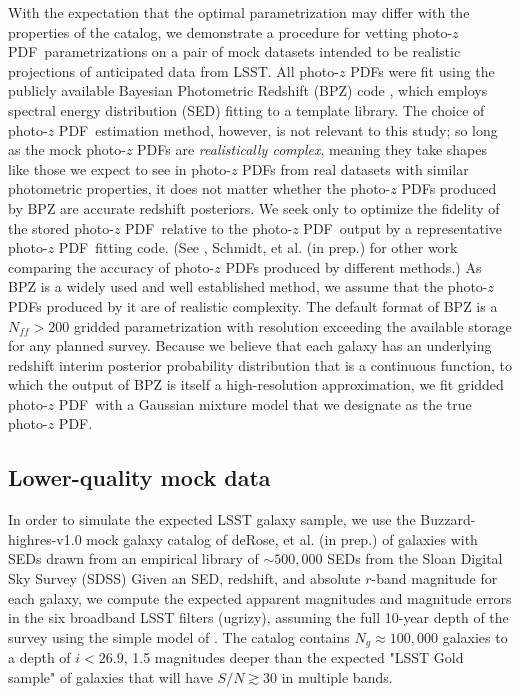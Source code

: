 \documentclass[\docopts]{\docclass}
\newcommand{\pz}{photo-$z$ PDF}
\begin{document}
With the expectation that the optimal parametrization may differ with the 
properties of the catalog, we demonstrate a procedure for vetting \pz\ 
parametrizations on a pair of mock datasets intended to be realistic 
projections of anticipated data from LSST.  All \pz s were fit using the 
publicly available Bayesian Photometric Redshift (BPZ) code 
\citep{benitez_bayesian_2000}, which employs spectral energy distribution (SED) 
fitting to a template library.  The choice of \pz\ estimation method, however, 
is not relevant to this study; so long as the mock \pz s are 
\textit{realistically complex}, meaning they take shapes like those we expect 
to see in \pz s from real datasets with similar photometric properties, it does 
not matter whether the \pz s produced by BPZ are accurate redshift posteriors.  
We seek only to optimize the fidelity of the stored \pz\ relative to the \pz\ 
output by a representative \pz\ fitting code.  (See 
\citet{tanaka_photometric_2017}, Schmidt, et al. (in prep.) for other work 
comparing the accuracy of \pz s produced by different methods.)  As BPZ is a 
widely used and well established method, we assume that the \pz s produced by 
it are of realistic complexity.  The default format of BPZ is a $N_{ff}>200$ 
gridded parametrization with resolution exceeding the available storage for any 
planned survey.  Because we believe that each galaxy has an underlying redshift 
interim posterior probability distribution that is a continuous function, to 
which the output of BPZ is itself a high-resolution approximation, we fit 
gridded \pz\ with a Gaussian mixture model that we designate as the true \pz.

\subsection{Lower-quality mock data}
\label{sec:LSST}


In order to simulate the expected LSST galaxy sample, we use the 
Buzzard-highres-v1.0 mock galaxy catalog of deRose, et al. (in prep.) of 
galaxies with SEDs drawn from an empirical library of $\sim500,000$ SEDs from 
the Sloan Digital Sky Survey (SDSS)
Given an SED, redshift, and absolute $r$-band magnitude for each galaxy, we 
compute the expected apparent magnitudes and magnitude errors in the six 
broadband LSST filters (ugrizy), assuming the full 10-year depth of the survey 
using the simple model of \citet{ivezic_lsst:_2008}.  The catalog contains 
$N_{g}\approx100,000$ galaxies to a depth of $i<26.9$, 1.5 magnitudes deeper 
than the expected "LSST Gold sample" of galaxies that will have $S/N\gtrsim30$ 
in multiple bands.
\end{document}
